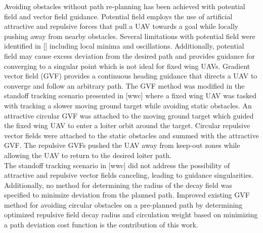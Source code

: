 \documentclass[conf]{new-aiaa}
\begin{document}
Avoiding obstacles without path re-planning has been achieved with potential field \cite{borenstein_real-time_1990,borenstein_vector_1991} and vector field \cite{frew_cooperative_2007,griffiths_vector_2006,goncalves_artificial_2009,goncalves_circulation_2010,goncalves_vector_2010} guidance. Potential field employs the use of artificial attractive and repulsive forces that pull a UAV towards a goal while locally pushing away from nearby obstacles.  Several limitations with potential field were identified in [] including local minima and oscillations. Additionally, potential field may cause excess deviation from the desired path and provides guidance for converging to a singular point which is not ideal for fixed wing UAVs.
Gradient vector field (GVF) provides a continuous heading guidance that directs a UAV to converge and follow an arbitrary path. The GVF method was modified in the standoff tracking scenario presented in [wwc] where a fixed wing UAV was tasked with tracking a slower moving ground target while avoiding static obstacles. An attractive circular GVF was attached to the moving ground target which guided the fixed wing UAV to enter a loiter orbit around the target. Circular repulsive vector fields were attached to the static obstacles and summed with the attractive GVF. The repulsive GVFs pushed the UAV away from keep-out zones while allowing the UAV to return to the desired loiter path. \\

The standoff tracking scenario in [wwc] did not address the possibility of attractive and repulsive vector fields canceling, leading to guidance singularities. Additionally, no method for determining the radius of the decay field was specified to minimize deviation from the planned path. Improved existing GVF method for avoiding circular obstacles on a pre-planned path by determining optimized repulsive field decay radius and circulation weight based on minimizing a path deviation cost function is the contribution of this work. 
\end{document}
